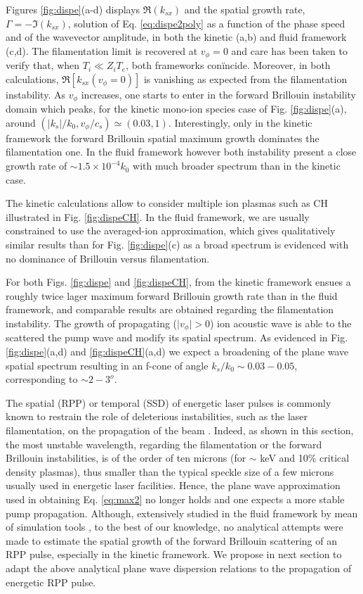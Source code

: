 \documentclass[
 reprint,
 amsmath,amssymb,
 aps,
]{revtex4-1}
\begin{document}
Figures \ref{fig:dispe}(a-d) displays  $\Re(k_{sx})$ and the spatial growth rate,  $\Gamma=-\Im(k_{sx})$, solution of Eq. \eqref{eq:dispe2poly} as a function of the phase speed and of the wavevector amplitude, in both the kinetic (a,b) and fluid framework (c,d). The filamentation limit is recovered at $v_\phi=0$ and care has been taken to verify that, when $T_i\ll Z_iT_e$, both frameworks con\"incide. Moreover, in both calculations, $\Re[k_{sx}(v_\phi=0)]$ is vanishing as expected from the filamentation instability. As $v_\phi$ increases, one starts to enter in the forward Brillouin instability domain which peaks, for the kinetic  mono-ion species case of Fig. \ref{fig:dispe}(a), around $(\vert k_s\vert/k_0, v_\phi/c_s) \simeq(0.03,1)$. Interestingly, only in the kinetic framework  the forward Brillouin spatial maximum  growth dominates the filamentation one. In the fluid framework however both instability present a close  growth rate of $\sim 1.5\times 10^{-4} k_0$  with much  broader  spectrum than in the kinetic case.

The kinetic calculations allow to consider multiple ion plasmas such as CH  illustrated in Fig. \ref{fig:dispeCH}. In the fluid framework, we are usually constrained to use the averaged-ion approximation, which gives qualitatively similar results than for Fig. \ref{fig:dispe}(c) as a broad spectrum is evidenced with no dominance of Brillouin versus filamentation. 

For both Figs. \ref{fig:dispe} and \ref{fig:dispeCH},   from the kinetic framework ensues a  roughly twice lager maximum forward Brillouin growth rate than in the fluid framework,  and comparable results are obtained regarding the filamentation instability. 
The growth of propagating ($\vert v_\phi\vert >0$) ion acoustic wave   is able to the scattered the pump wave and modify its spatial spectrum. As evidenced in Fig. \ref{fig:dispe}(a,d) and \ref{fig:dispeCH}(a,d) we expect a broadening of the plane wave spatial spectrum  resulting in an f-cone   of angle $k_s/k_0\sim 0.03-0.05$, corresponding to $\sim 2-3^o$.  

The spatial (RPP) or temporal (SSD) of energetic laser pulses is commonly known to restrain the role of deleterious instabilities, such as the laser filamentation, on the propagation of the beam \cite[]{Kato_1984,NatPhys_Glenzer}. Indeed, as shown in this section, the most unstable wavelength, regarding the filamentation or the forward Brillouin instabilities, is of the order of ten   microns (for $\sim$ keV and 10\% critical density plasmas), thus smaller than the typical  speckle size   of a few microns   usually used in energetic laser facilities.  
Hence, the plane wave approximation used in obtaining Eq. \eqref{eq:max2} no longer holds and one expects a more stable pump propagation.
Although, extensively studied in the fluid framework by mean of simulation tools \cite[]{}, to the best of our knowledge, no analytical attempts were made to estimate the spatial growth of the forward Brillouin scattering of an RPP pulse, especially in the kinetic framework. 
We propose in next section to adapt the above analytical plane wave dispersion relations  to the propagation of energetic RPP pulse.
\end{document}
